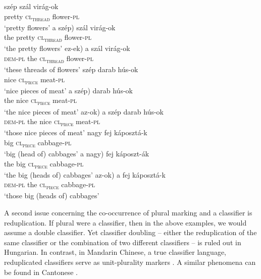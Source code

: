 \documentclass[output=paper]{langscibook}
\begin{document}
\ea \label{schv-nem:ex:20}
\ea \label{schv-nem:ex:20a}
\gll szép szál virág-ok \\  
pretty \textsc{cl\textsubscript{thread}} flower-\textsc{pl}\\ 
\glt `pretty flowers'
\ex \label{schv-nem:ex:20b}
\gll a \minsp{(} szép) szál virág-ok\\
the {} pretty \textsc{cl\textsubscript{thread}} flower-\textsc{pl}\\
\glt `the pretty flowers'
\ex \label{schv-nem:ex:20c}
\gll \minsp{(} ez-ek) a szál virág-ok \\
{} \textsc{dem}-\textsc{pl} the \textsc{cl\textsubscript{thread}} flower-\textsc{pl}\\
\glt `these threads of flowers'
\z
\ex \label{schv-nem:ex:21}
\ea \label{schv-nem:ex:21a}
\gll  szép darab hús-ok \\  
nice \textsc{cl\textsubscript{piece}}  meat-\textsc{pl}\\ 
\glt `nice pieces of meat'
\ex \label{schv-nem:ex:21b}
\gll a \minsp{(} szép) darab hús-ok \\
the {} nice \textsc{cl\textsubscript{piece}} meat-\textsc{pl}\\
\glt `the nice pieces of meat'
\ex \label{schv-nem:ex:21c}
\gll \minsp{(} az-ok) a szép darab hús-ok \\
{} \textsc{dem}-\textsc{pl} the nice \textsc{cl\textsubscript{piece}} meat-\textsc{pl}\\
\glt `those nice pieces of meat'
\z
\ex \label{schv-nem:ex:22}
\ea \label{schv-nem:ex:22a}
\gll nagy fej káposztá-k \\  
big \textsc{cl\textsubscript{piece}} cabbage-\textsc{pl}\\ 
\glt `big (head of) cabbages'
\ex \label{schv-nem:ex:22b}
\gll a \minsp{(} nagy) fej káposzt-ák     \\
the {} big \textsc{cl\textsubscript{piece}} cabbage-\textsc{pl}\\
\glt `the big (heads of) cabbages'
\ex \label{schv-nem:ex:22c}
\gll \minsp{(} az-ok) a fej káposztá-k \\
{} \textsc{dem}-\textsc{pl} the \textsc{cl\textsubscript{piece}} cabbage-\textsc{pl}\\
\glt `those big (heads of) cabbages'
\z
\z

\noindent A second issue concerning the co-occurrence of plural marking and a classifier is reduplication. If plural were a classifier, then in the above examples, we would assume a double classifier. Yet classifier doubling -- either the reduplication of the same classifier  or the combination of two different classifiers  -- is ruled out in Hungarian. In contrast, in Mandarin Chinese, a true classifier language, reduplicated classifiers serve as unit-plurality markers  \citep{zhang-13}. A similar phenomena can be found in Cantonese  \citep{wong-98}.
\end{document}
